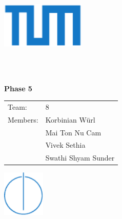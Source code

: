 \begin{titlepage}
  \centering

  \includegraphics[width=40mm]{logos/tum}

  \vspace{5mm}
  {\huge\MakeUppercase{\getFaculty{}}}\\

  \vspace{5mm}
  {\large\MakeUppercase{\getUniversity{}}}\\

  \vspace{15mm}
  {\huge\bfseries \getTitle{}}

  \vspace{10mm}
  {\huge\bfseries Phase 5}

  \vspace{15mm}
  \begin{tabular}{l l}
    Team: & 8 \\
    Members:  & Korbinian Würl \\
              & Mai Ton Nu Cam \\
              & Vivek Sethia \\
              & Swathi Shyam Sunder
  \end{tabular}

  \vspace{20mm}
  \includegraphics[width=20mm]{logos/faculty}
\end{titlepage}

